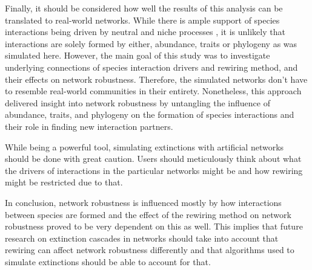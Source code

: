 \documentclass[12pt,a4paper]{article}
\begin{document}
%



Finally, it should be considered how well the results of this analysis can be translated to real-world networks. While there is ample support of species interactions being driven by neutral and niche processes \parencite{Jordano2003, Rezende2007, Vazquez2007, Bluethgen2008}, it is unlikely that interactions are solely formed by either, abundance, traits or phylogeny as was simulated here. However, the main goal of this study was to investigate underlying
connections of species interaction drivers and rewiring method, and their effects on network robustness. Therefore, the simulated networks don't have to resemble real-world communities in their entirety. Nonetheless, this approach delivered insight into network robustness by untangling the influence of abundance, traits, and phylogeny on the formation of species interactions and their role in finding new interaction partners.

While being a powerful tool, simulating extinctions with artificial networks should be done with great caution. Users should meticulously think about what the drivers of interactions in the particular networks might be and how rewiring might be restricted due to that. 

In conclusion, network robustness is influenced mostly by how interactions between species are formed and the effect of the rewiring method on network robustness proved to be very dependent on this as well. This implies that future research on extinction cascades in networks should take into account that rewiring can affect network robustness differently and that algorithms used to simulate extinctions should be able to account for that.
\end{document}
